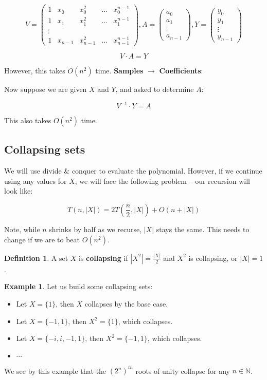 \documentclass[11pt]{article}
\theoremstyle{plain}
\theoremstyle{definition}
\newtheorem*{defn}{Definition}
\newtheorem*{ex}{Example}
\newcommand{\N}{\mathbb{N}}
\begin{document}
$$
V = \begin{pmatrix}
    1 & x_0 & x_0^2 & \dots & x_0^{n-1}\\
    1 & x_1 & x_1^2 & \dots & x_1^{n-1}\\
    \vdots\\
    1 & x_{n-1} & x_{n-1}^2 & \ldots & x_{n-1}^{n-1}
\end{pmatrix},
A = \begin{pmatrix}
    a_0\\
    a_1\\
    \vdots\\
    a_{n-1}
\end{pmatrix},
Y = \begin{pmatrix}
    y_0\\
    y_1\\
    \vdots\\
    y_{n-1}
\end{pmatrix}
$$

$$ V \cdot A = Y $$

However, this takes $O(n^2)$ time.
\bigbreak
\noindent\textbf{Samples} $\rightarrow$ \textbf{Coefficients}:

Now suppose we are given $X$ and $Y$, and asked to determine $A$:

$$V^{-1} \cdot Y = A$$

This also takes $O(n^2)$ time.

\subsection{Collapsing sets}

We will use divide \& conquer to evaluate the polynomial. However, if we continue using any values
for $X$, we will face the following problem -- our recursion will look like:

$$T(n, |X|) = 2T(\frac{n}{2}, |X|) + O(n + |X|)$$

Note, while $n$ shrinks by half as we recurse, $|X|$ stays the same. This needs to change if we are
to beat $O(n^2)$.

\begin{defn}
    A set $X$ is \textbf{collapsing} if $|X^2| = \displaystyle\frac{|X|}{2}$ and $X^2$ is collapsing, 
    or $|X| = 1$.
\end{defn}

\begin{ex}
    Let us build some collapsing sets:
    \begin{itemize}
        \item Let $X = \{ 1 \}$, then $X$ collapses by the base case.
        \item Let $X = \{ -1, 1 \}$, then $X^2 = \{ 1 \}$, which collapses.
        \item Let $X = \{ -i, i, -1, 1 \}$, then $X^2 = \{ -1, 1 \}$, which collapses.
        \item $\cdots$
    \end{itemize}

    We see by this example that the $(2^n)^{th}$ roots of unity collapse for any $n \in \N$.
\end{ex}
\end{document}
